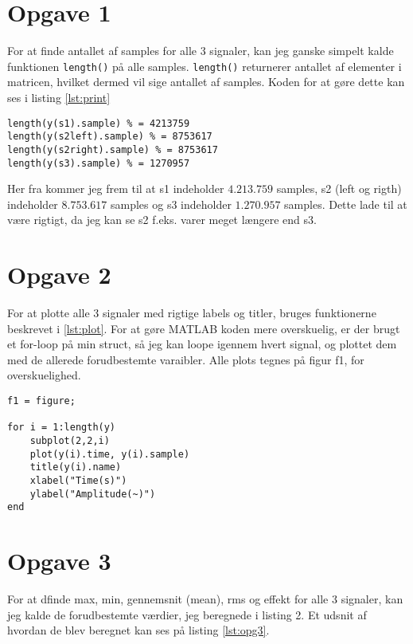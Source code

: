 \documentclass[../main.tex]{subfiles}
\begin{document}
\section*{Opgave 1}
For at finde antallet af samples for alle 3 signaler, kan jeg ganske simpelt kalde funktionen \lstinline{length()} på alle samples. \lstinline{length()} returnerer antallet af elementer i matricen, hvilket dermed vil sige antallet af samples. Koden for at gøre dette kan ses i listing \ref{lst:print}

\begin{lstlisting}[caption=Print af antal samples, label=lst:print]
length(y(s1).sample) % = 4213759
length(y(s2left).sample) % = 8753617
length(y(s2right).sample) % = 8753617
length(y(s3).sample) % = 1270957
\end{lstlisting}

Her fra kommer jeg frem til at s1 indeholder \(4.213.759\) samples, s2 (left og rigth) indeholder \(8.753.617\) samples og s3 indeholder \(1.270.957\) samples. Dette lade til at være rigtigt, da jeg kan se s2 f.eks. varer meget længere end s3.


\section*{Opgave 2}

For at plotte alle 3 signaler med rigtige labels og titler, bruges funktionerne beskrevet i \ref{lst:plot}. For at gøre MATLAB koden mere overskuelig, er der brugt et for-loop på min struct, så jeg kan loope igennem hvert signal, og plottet dem med de allerede forudbestemte varaibler. Alle plots tegnes på figur f1, for overskuelighed.

\begin{lstlisting}[caption={Plot af s1, s2 og s3}, label=lst:plot]
%% Exercise 2
f1 = figure;

for i = 1:length(y)
	subplot(2,2,i)
	plot(y(i).time, y(i).sample)
	title(y(i).name)
	xlabel("Time(s)")
	ylabel("Amplitude(~)")
end
\end{lstlisting}



\section*{Opgave 3}

For at dfinde max, min, gennemsnit (mean), rms og effekt for alle 3 signaler, kan jeg kalde de forudbestemte værdier, jeg beregnede i listing 2. Et udsnit af hvordan de blev beregnet kan ses på listing \ref{lst:opg3}. 
\end{document}
